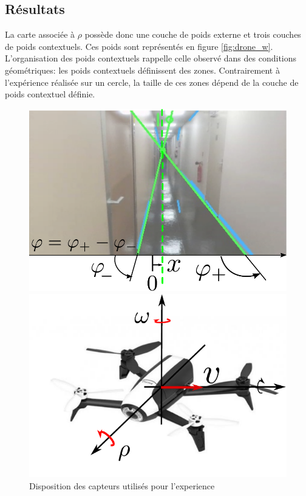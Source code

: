 
\subsection{Résultats}
La carte associée à $\rho$ possède donc une couche de poids externe et trois couches de poids contextuels. Ces poids sont représentés en figure \ref{fig:drone_w}. L'organisation des poids contextuels rappelle celle observé dans des conditions géométriques: les poids contextuels définissent des zones. Contrairement à l'expérience réalisée sur un cercle, la taille de ces zones dépend de la couche de poids contextuel définie. 

\begin{figure}
\begin{minipage}{0.5\textwidth}
\includegraphics[width=\textwidth]{visudrone}
\end{minipage}
\begin{minipage}{0.5\textwidth}
\includegraphics[width=\textwidth]{dronesteup}
\end{minipage}
\caption{Disposition des capteurs utilisés pour l'experience}
\label{fig:drone}
\end{figure}

